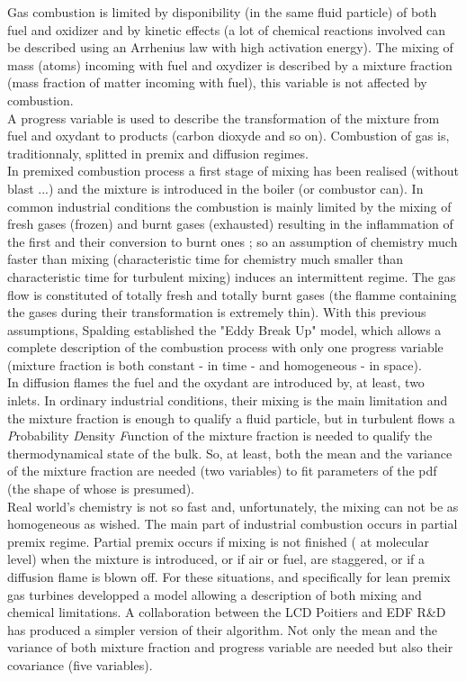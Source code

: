 Gas combustion is limited by disponibility (in the same fluid particle) of both
fuel and oxidizer and by kinetic effects (a lot of chemical reactions involved
can be described using an Arrhenius law with high activation energy). The mixing
of mass (atoms) incoming with fuel and oxydizer is described by a mixture
fraction (mass fraction of matter incoming with fuel), this
variable is not affected by combustion.\\
A progress variable is used to describe the transformation of the mixture from
fuel and oxydant to products (carbon dioxyde and so on).
Combustion of gas is, traditionnaly, splitted in premix and diffusion regimes.\\
In premixed combustion process a first stage of mixing has been realised
(without blast ...) and the mixture is introduced in the boiler (or combustor
can). In common industrial conditions the combustion is mainly limited by the
mixing of fresh gases (frozen) and burnt gases (exhausted) resulting in the
inflammation of the first and their conversion to burnt ones ; so an assumption
of chemistry much faster than mixing (characteristic time for chemistry much
smaller than characteristic time for turbulent mixing) induces an intermittent
regime. The gas flow is constituted of totally fresh and totally burnt gases
(the flamme containing the gases during their transformation is extremely
thin). With this previous assumptions, Spalding \cite{1} established the "Eddy
Break Up" model, which allows a complete description of the combustion process
with only one progress variable (mixture fraction is both constant
- in time - and homogeneous - in space).\\
In diffusion flames the fuel and the oxydant are introduced by, at least, two
inlets. In ordinary industrial conditions, their mixing is the main limitation
and the mixture fraction is enough to qualify a fluid particle, but in turbulent
flows a {\em P}robability {\em D}ensity {\em F}unction of the mixture fraction
is needed to qualify the thermodynamical state of the bulk. So, at least, both
the mean and the variance of the mixture fraction are needed (two variables) to
fit parameters of the pdf (the shape of whose is presumed).\\
Real world's chemistry is not so fast and, unfortunately, the mixing can not be
as homogeneous as wished. The main part of industrial combustion occurs in
partial premix regime. Partial premix occurs if mixing is not finished ( at
molecular level) when the mixture is introduced, or if air or fuel, are
staggered, or if a diffusion flame is blown off. For these situations, and
specifically for lean premix gas turbines \cite{2} developped a model allowing a
description of both mixing and chemical limitations. A collaboration between the
LCD Poitiers \cite{3} and EDF R\&D has produced a simpler version of their
algorithm. Not only the mean and the variance of both mixture fraction and
progress variable are needed but also their covariance (five variables).
 

